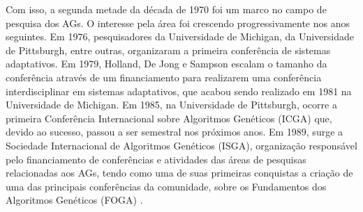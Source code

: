 Com isso, a segunda metade da década de 1970 foi um marco no campo de pesquisa dos AGs. O interesse pela área foi crescendo progressivamente nos anos seguintes. Em 1976, pesquisadores da Universidade de Michigan, da Universidade de Pittsburgh, entre outras, organizaram a primeira conferência de sistemas adaptativos. Em 1979, Holland, De Jong e Sampson escalam o tamanho da conferência através de um financiamento para realizarem uma conferência interdisciplinar em sistemas adaptativos, que acabou sendo realizado em 1981 na Universidade de Michigan. Em 1985, na Universidade de Pittsburgh, ocorre a primeira Conferência Internacional sobre Algoritmos Genéticos (ICGA) que, devido ao sucesso, passou a ser semestral nos próximos anos. Em 1989, surge a Sociedade Internacional de Algoritmos Genéticos (ISGA), organização responsável pelo financiamento de conferências e atividades das áreas de pesquisas relacionadas aos AGs, tendo como uma de suas primeiras conquistas a criação de uma das principais conferências da comunidade, sobre os Fundamentos dos Algoritmos Genéticos (FOGA) \cite[pg.A2.3:5]{back_handbook_1997}.
